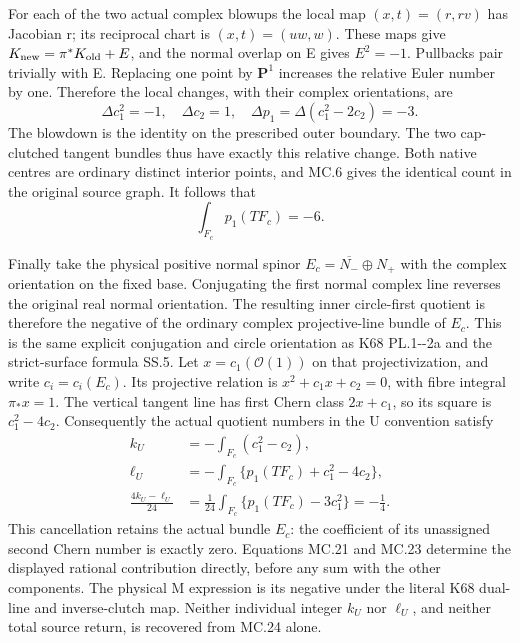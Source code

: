 For each of the two actual complex blowups the local
map \((x,t)=(r,rv)\) has Jacobian r; its reciprocal
chart is \((x,t)=(uw,w)\). These maps give
\(K_{\rm new}=\pi^*K_{\rm old}+E\), and the normal
overlap on E gives \(E^2=-1\). Pullbacks pair trivially
with E. Replacing one point by \(\mathbf P^1\) increases
the relative Euler number by one. Therefore the local
changes, with their complex orientations, are
\[
 \Delta c_1^2=-1,\quad\Delta c_2=1,
 \quad\Delta p_1=\Delta(c_1^2-2c_2)=-3.                \tag{MC.22}
\]
The blowdown is the identity on the prescribed outer
boundary. The two cap-clutched tangent bundles thus
have exactly this relative change. Both native centres
are ordinary distinct interior points, and MC.6 gives
the identical count in the original source graph.
It follows that
\[
 \int_{F_c}p_1(TF_c)=-6.                                \tag{MC.23}
\]

Finally take the physical positive normal spinor
\(E_c=\overline{N_-}\oplus N_+\) with the complex
orientation on the fixed base. Conjugating the first
normal complex line reverses the original real normal
orientation. The resulting inner circle-first quotient
is therefore the negative of the ordinary complex
projective-line bundle of \(E_c\). This is the same
explicit conjugation and circle orientation as K68
PL.1-\/-2a and the strict-surface formula SS.5. Let
\(x=c_1(\mathcal O(1))\) on that projectivization,
and write \(c_i=c_i(E_c)\). Its projective relation is
\(x^2+c_1x+c_2=0\), with fibre integral \(\pi_*x=1\).
The vertical tangent line has first Chern class
\(2x+c_1\), so its square is \(c_1^2-4c_2\).
Consequently the actual quotient numbers in the U
convention satisfy
\[
 \begin{aligned}
 k_U&=-\int_{F_c}(c_1^2-c_2),\\
 \ell_U&=-\int_{F_c}\{p_1(TF_c)+c_1^2-4c_2\},\\
 \frac{4k_U-\ell_U}{24}
   &=\frac1{24}\int_{F_c}\{p_1(TF_c)-3c_1^2\}
     =-\frac14.                                       
 \end{aligned} \tag{MC.24}
\]
This cancellation retains the actual bundle \(E_c\):
the coefficient of its unassigned second Chern number
is exactly zero. Equations MC.21 and MC.23 determine
the displayed rational contribution directly, before
any sum with the other components. The physical M
expression is its negative under the literal K68
dual-line and inverse-clutch map. Neither individual
integer \(k_U\) nor \(\ell_U\), and neither total
source return, is recovered from MC.24 alone.

